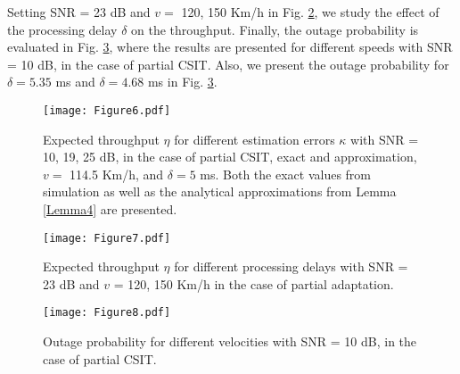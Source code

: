 Setting SNR = 23 dB and $v = $ 120, 150 Km/h in Fig. \ref{fig_Figure7},  we study the effect of the processing delay $\delta$ on the throughput. Finally, the outage probability is evaluated in Fig. \ref{fig_Figure8}, where the results are presented for different speeds with SNR = 10 dB, in the case of partial CSIT. Also, we present  the outage probability for $\delta = 5.35$ ms and $\delta = 4.68$ ms in Fig.  \ref{fig_Figure8}. 




\begin{figure}
\centering
  \texttt{[image: Figure6.pdf]}\\
\caption{Expected throughput $\eta$ for different estimation errors $\kappa$ with SNR = 10, 19, 25 dB, in the case of partial CSIT, exact and approximation,  $v = $  114.5 Km/h, and $\delta = 5$ ms. Both the exact values from simulation as well as the analytical approximations from Lemma \ref{Lemma4} are presented.}\label{fig_Figure6}
\end{figure}


\begin{figure}
\centering
  \texttt{[image: Figure7.pdf]}\\
\caption{Expected throughput $\eta$ for different processing delays with SNR = 23 dB and $v$ = 120, 150 Km/h in the case of partial adaptation. }\label{fig_Figure7}

\end{figure}

\begin{figure}
\centering
  \texttt{[image: Figure8.pdf]}\\
\caption{Outage probability for different velocities with SNR = 10 dB, in the case of partial CSIT.}\label{fig_Figure8}

\end{figure}




